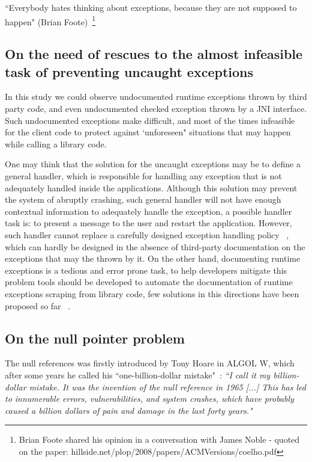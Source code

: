 \documentclass[conference]{IEEEtran}
\begin{document}
 ``Everybody hates thinking about exceptions, because they are not supposed to happen"
  (Brian Foote)~\footnote{Brian Foote shared his opinion in a conversation with James Noble - quoted on the paper: hillside.net/plop/2008/papers/ACMVersions/coelho.pdf}


\subsection{On the need of rescues to the almost infeasible task of preventing uncaught exceptions}
In this study we could observe undocumented runtime exceptions thrown by third party code,
and even undocumented checked exception thrown by a JNI interface.
Such undocumented exceptions make difficult, and most of the times infeasible
for the client code to protect against `unforeseen" situations that may happen 
while calling a library code.

One may think that the solution for the uncaught exceptions may be to define a general handler, 
which is responsible for handling any exception that is not
adequately handled inside the applications. Although this 
solution may prevent  the system of abruptly crashing,
 such general handler will not have enough
contextual information to adequately handle the exception, 
a possible handler task is: to present a message to the user
 and restart the application. However, such handler cannot replace a carefully designed exception 
handling policy ~\cite{Robil00}, which can hardly be designed in the absence of 
third-party documentation on the exceptions that
may the thrown by it. On the other hand, documenting runtime exceptions is a tedious and error prone task, to help developers
mitigate this problem tools should be developed to automate the documentation of runtime exceptions
scraping from library code, few solutions in this directions have been proposed so far ~\cite{van2005combining}. 

\subsection{On the null pointer problem}
The null references was firstly introduced by Tony Hoare in ALGOL W, which after some years he called his ``one-billion-dollar mistake"~\cite{hoare2}:
\emph{``I call it my billion-dollar mistake. It was the invention of the null reference in 1965 [...] This has led to innumerable errors, vulnerabilities, and system 
crashes, which have probably caused a billion dollars of pain and damage in the last forty years."}
\end{document}
